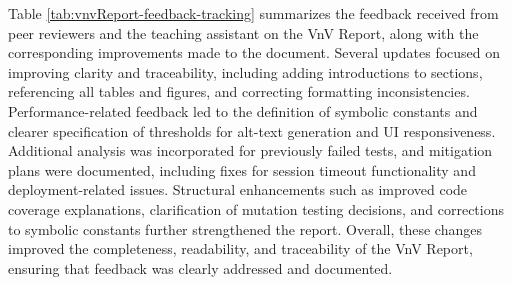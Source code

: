 \documentclass{article}
\begin{document}
Table \ref{tab:vnvReport-feedback-tracking} summarizes the feedback received from peer reviewers and the teaching assistant on the VnV Report, along with the corresponding improvements made to the document. Several updates focused on improving clarity and traceability, including adding introductions to sections, referencing all tables and figures, and correcting formatting inconsistencies. Performance-related feedback led to the definition of symbolic constants and clearer specification of thresholds for alt-text generation and UI responsiveness. Additional analysis was incorporated for previously failed tests, and mitigation plans were documented, including fixes for session timeout functionality and deployment-related issues. Structural enhancements such as improved code coverage explanations, clarification of mutation testing decisions, and corrections to symbolic constants further strengthened the report. Overall, these changes improved the completeness, readability, and traceability of the VnV Report, ensuring that feedback was clearly addressed and documented.
\renewcommand{\arraystretch}{1.5}
\end{document}
